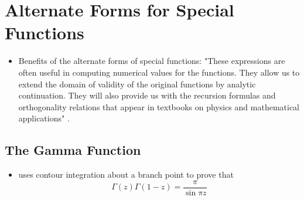 \documentclass[../finalProject.tex]{subfiles}
\begin{document}
\section{Alternate Forms for Special Functions}
\begin{itemize}
    \item {}Benefits of the alternate forms of special functions: "These expressions are often useful in computing numerical values for the functions. They allow us to extend the domain of validity of the original functions by analytic continuation. They will also provide us with the recursion formulas and orthogonality relations that appear in textbooks on physics and mathematical applications" \parencite[155]{bib:Seaborn}.
\end{itemize}


\subsection{The Gamma Function}
\begin{itemize}
    \item \textcite{bib:Seaborn} uses contour integration about a branch point to prove that
    \begin{equation*}
        \Gamma(z)\Gamma(1-z) = \frac{\pi}{\sin\pi z}
    \end{equation*}
\end{itemize}


\end{document}
